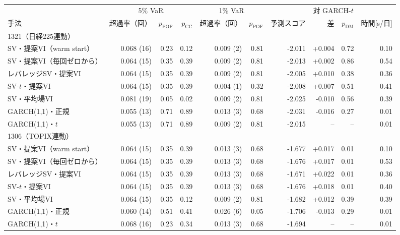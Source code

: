 \begin{tabular}{lrrrrrrrrr}
\toprule
 & \multicolumn{3}{c}{5\% VaR} & \multicolumn{2}{c}{1\% VaR} & & \multicolumn{2}{c}{対 GARCH-$t$} & \\
\cmidrule(lr){2-4} \cmidrule(lr){5-6} \cmidrule(lr){8-9}
手法 & 超過率（回） & $p_{\mathrm{POF}}$ & $p_{\mathrm{CC}}$ & 超過率（回） & $p_{\mathrm{POF}}$ & 予測スコア & 差 & $p_{\mathrm{DM}}$ & 時間[s/日] \\
\midrule
\multicolumn{10}{l}{1321（日経225連動）} \\
SV・提案VI（warm start） & 0.068 (16) & 0.23 & 0.12 & 0.009 (2) & 0.81 & -2.011 & +0.004 & 0.72 & 0.10 \\
SV・提案VI（毎回ゼロから） & 0.064 (15) & 0.35 & 0.39 & 0.009 (2) & 0.81 & -2.013 & +0.002 & 0.86 & 0.54 \\
レバレッジSV・提案VI & 0.064 (15) & 0.35 & 0.39 & 0.009 (2) & 0.81 & -2.005 & +0.010 & 0.38 & 0.36 \\
SV-$t$・提案VI & 0.064 (15) & 0.35 & 0.39 & 0.004 (1) & 0.32 & -2.008 & +0.007 & 0.51 & 0.41 \\
SV・平均場VI & 0.081 (19) & 0.05 & 0.02 & 0.009 (2) & 0.81 & -2.025 & -0.010 & 0.56 & 0.39 \\
GARCH(1,1)・正規 & 0.055 (13) & 0.71 & 0.89 & 0.013 (3) & 0.68 & -2.031 & -0.016 & 0.27 & 0.01 \\
GARCH(1,1)・$t$ & 0.055 (13) & 0.71 & 0.89 & 0.009 (2) & 0.81 & -2.015 & -- & -- & 0.01 \\
\midrule
\multicolumn{10}{l}{1306（TOPIX連動）} \\
SV・提案VI（warm start） & 0.064 (15) & 0.35 & 0.39 & 0.013 (3) & 0.68 & -1.677 & +0.017 & 0.01 & 0.10 \\
SV・提案VI（毎回ゼロから） & 0.064 (15) & 0.35 & 0.39 & 0.013 (3) & 0.68 & -1.676 & +0.017 & 0.01 & 0.53 \\
レバレッジSV・提案VI & 0.064 (15) & 0.35 & 0.39 & 0.013 (3) & 0.68 & -1.671 & +0.022 & 0.01 & 0.36 \\
SV-$t$・提案VI & 0.064 (15) & 0.35 & 0.39 & 0.013 (3) & 0.68 & -1.676 & +0.018 & 0.01 & 0.40 \\
SV・平均場VI & 0.064 (15) & 0.35 & 0.12 & 0.009 (2) & 0.81 & -1.682 & +0.012 & 0.39 & 0.39 \\
GARCH(1,1)・正規 & 0.060 (14) & 0.51 & 0.41 & 0.026 (6) & 0.05 & -1.706 & -0.013 & 0.29 & 0.01 \\
GARCH(1,1)・$t$ & 0.068 (16) & 0.23 & 0.34 & 0.013 (3) & 0.68 & -1.694 & -- & -- & 0.01 \\
\bottomrule
\end{tabular}
